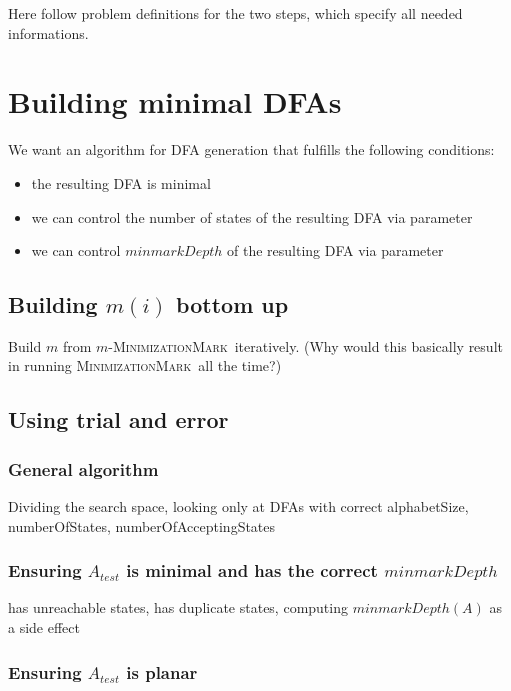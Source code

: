 \documentclass[a4paper, oneside, 11pt]{report}
\theoremstyle{definition}
\theoremstyle{remark}
\newcommand{\MinMark}{\textsc{MinimizationMark}}
\begin{document}
Here follow problem definitions for the two steps, which specify all needed informations.



\chapter{Building minimal DFAs}

We want an algorithm for DFA generation that fulfills the following conditions:
\begin{itemize}
	\item the resulting DFA is minimal
	\item we can control the number of states of the resulting DFA via parameter
	\item we can control $minmarkDepth$ of the resulting DFA via parameter
\end{itemize}

\section{Building $m(i)$ bottom up}

Build $m$ from $m$-\MinMark\ iteratively. (Why would this basically result in running \MinMark\ all the time?)

\section{Using trial and error}

\subsection{General algorithm}

Dividing the search space, looking only at DFAs with correct alphabetSize, numberOfStates, numberOfAcceptingStates

\subsection{Ensuring $A_{test}$ is minimal and has the correct $minmarkDepth$}

has unreachable states, has duplicate states, computing $minmarkDepth(A)$ as a side effect

\subsection{Ensuring $A_{test}$ is planar}
\end{document}
